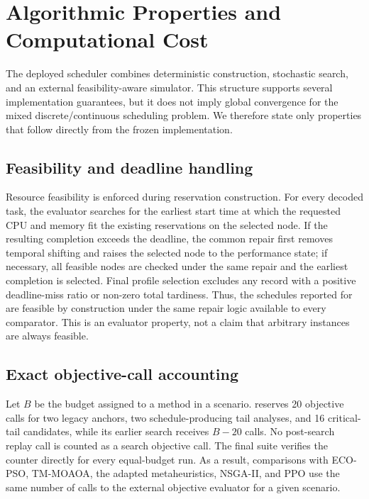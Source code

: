 \section{Algorithmic Properties and Computational Cost}
\label{sec:properties}

The deployed scheduler combines deterministic construction, stochastic search, and an external feasibility-aware simulator. This structure supports several implementation guarantees, but it does not imply global convergence for the mixed discrete/continuous scheduling problem. We therefore state only properties that follow directly from the frozen implementation.

\subsection{Feasibility and deadline handling}

Resource feasibility is enforced during reservation construction. For every decoded task, the evaluator searches for the earliest start time at which the requested CPU and memory fit the existing reservations on the selected node. If the resulting completion exceeds the deadline, the common repair first removes temporal shifting and raises the selected node to the performance state; if necessary, all feasible nodes are checked under the same repair and the earliest completion is selected. Final profile selection excludes any record with a positive deadline-miss ratio or non-zero total tardiness. Thus, the schedules reported for \method are feasible by construction under the same repair logic available to every comparator. This is an evaluator property, not a claim that arbitrary instances are always feasible.

\subsection{Exact objective-call accounting}

Let $B$ be the budget assigned to a method in a scenario. \method reserves 20 objective calls for two legacy anchors, two schedule-producing tail analyses, and 16 critical-tail candidates, while its earlier search receives $B-20$ calls. No post-search replay call is counted as a search objective call. The final suite verifies the counter directly for every equal-budget run. As a result, comparisons with ECO-PSO, TM-MOAOA, the adapted metaheuristics, NSGA-II, and PPO use the same number of calls to the external objective evaluator for a given scenario.

